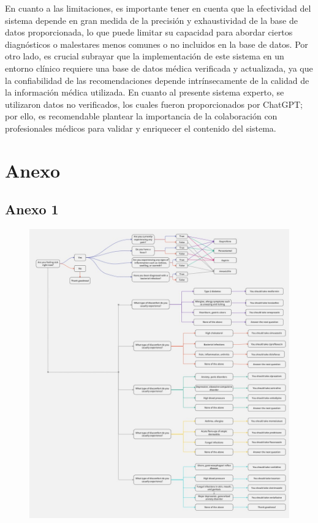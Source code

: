 \documentclass[11pt]{article}
\begin{document}
\begin{multicols}{2}
En cuanto a las limitaciones, es importante tener en cuenta que la efectividad del sistema depende en gran medida de la precisión y exhaustividad de la base de datos proporcionada, lo que puede limitar su capacidad para abordar ciertos diagnósticos o malestares menos comunes o no incluidos en la base de datos. Por otro lado, es crucial subrayar que la implementación de este sistema en un entorno clínico requiere una base de datos médica verificada y actualizada, ya que la confiabilidad de las recomendaciones depende intrínsecamente de la calidad de la información médica utilizada. En cuanto al presente sistema experto, se utilizaron datos no verificados, los cuales fueron proporcionados por ChatGPT; por ello, es recomendable plantear la importancia de la colaboración con profesionales médicos para validar y enriquecer el contenido del sistema.





 


\end{multicols}






\section{Anexo}

\subsection{Anexo 1}
\begin{figure}[H]
  \centering
  \includegraphics[width=\linewidth]{Graphs/SE_RM.jpg}
  \label{fig:miImagen}
\end{figure}
\end{document}
